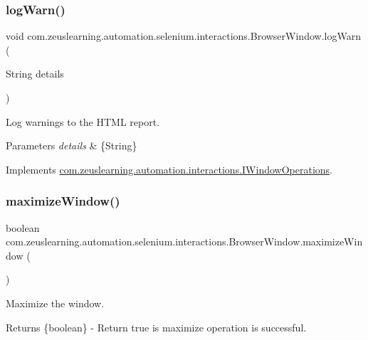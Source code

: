 \subsubsection{\texorpdfstring{log\+Warn()}{logWarn()}}
{\footnotesize\ttfamily void com.\+zeuslearning.\+automation.\+selenium.\+interactions.\+Browser\+Window.\+log\+Warn (\begin{DoxyParamCaption}\item[{String}]{details }\end{DoxyParamCaption})\hspace{0.3cm}{\ttfamily [inline]}}

Log warnings to the H\+T\+ML report.


\begin{DoxyParams}{Parameters}
{\em details} & \{String\} \\
\hline
\end{DoxyParams}


Implements \hyperlink{interfacecom_1_1zeuslearning_1_1automation_1_1interactions_1_1IWindowOperations_a8cb651e4ad3d55ef3ce0eeef34680a5a}{com.\+zeuslearning.\+automation.\+interactions.\+I\+Window\+Operations}.

\hypertarget{classcom_1_1zeuslearning_1_1automation_1_1selenium_1_1interactions_1_1BrowserWindow_a446ec66dd4fb469961b7242a9b0c1a35}{}\label{classcom_1_1zeuslearning_1_1automation_1_1selenium_1_1interactions_1_1BrowserWindow_a446ec66dd4fb469961b7242a9b0c1a35} 
\subsubsection{\texorpdfstring{maximize\+Window()}{maximizeWindow()}}
{\footnotesize\ttfamily boolean com.\+zeuslearning.\+automation.\+selenium.\+interactions.\+Browser\+Window.\+maximize\+Window (\begin{DoxyParamCaption}{ }\end{DoxyParamCaption})\hspace{0.3cm}{\ttfamily [inline]}}

Maximize the window.

\begin{DoxyReturn}{Returns}
\{boolean\} -\/ Return {\ttfamily true} is maximize operation is successful. 
\end{DoxyReturn}


